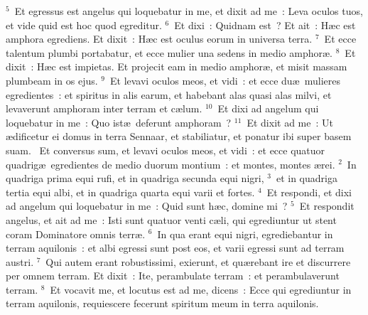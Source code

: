 ${}^{5}$~Et egressus est angelus qui loquebatur in me, et dixit ad me~: Leva oculos tuos, et vide quid est hoc quod egreditur.
${}^{6}$~Et dixi~: Quidnam est~? Et ait~: H\ae c est amphora egrediens. Et dixit~: H\ae c est oculus eorum in universa terra.
${}^{7}$~Et ecce talentum plumbi portabatur, et ecce mulier una sedens in medio amphor\ae .
${}^{8}$~Et dixit~: H\ae c est impietas. Et projecit eam in medio amphor\ae , et misit massam plumbeam in os ejus.
${}^{9}$~Et levavi oculos meos, et vidi~: et ecce du\ae\ mulieres egredientes~: et spiritus in alis earum, et habebant alas quasi alas milvi, et levaverunt amphoram inter terram et c\ae lum.
${}^{10}$~Et dixi ad angelum qui loquebatur in me~: Quo ist\ae\ deferunt amphoram~?
${}^{11}$~Et dixit ad me~: Ut \ae dificetur ei domus in terra Sennaar, et stabiliatur, et ponatur ibi super basem suam.
~\lettrine[lines=10,image=true,loversize=0.05,lraise=-0.03]{E}{}t conversus sum, et levavi oculos meos, et vidi~: et ecce quatuor quadrig\ae\ egredientes de medio duorum montium~: et montes, montes \ae rei.
${}^{2}$~In quadriga prima equi rufi, et in quadriga secunda equi nigri,
${}^{3}$~et in quadriga tertia equi albi, et in quadriga quarta equi varii et fortes.
${}^{4}$~Et respondi, et dixi ad angelum qui loquebatur in me~: Quid sunt h\ae c, domine mi~?
${}^{5}$~Et respondit angelus, et ait ad me~: Isti sunt quatuor venti c\ae li, qui egrediuntur ut stent coram Dominatore omnis terr\ae .
${}^{6}$~In qua erant equi nigri, egrediebantur in terram aquilonis~: et albi egressi sunt post eos, et varii egressi sunt ad terram austri.
${}^{7}$~Qui autem erant robustissimi, exierunt, et qu\ae rebant ire et discurrere per omnem terram. Et dixit~: Ite, perambulate terram~: et perambulaverunt terram.
${}^{8}$~Et vocavit me, et locutus est ad me, dicens~: Ecce qui egrediuntur in terram aquilonis, requiescere fecerunt spiritum meum in terra aquilonis.


